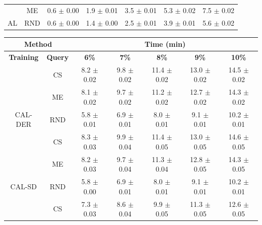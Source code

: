 \begin{table}[htbp]
\begin{tabular*}{\linewidth}{c|c|@{\extracolsep{\fill}}ccccc}
 & ME & 0.6 $\pm$ {\small 0.00} & 1.9 $\pm$ {\small 0.01} & 3.5 $\pm$ {\small 0.01} & 5.3 $\pm$ {\small 0.02} & 7.5 $\pm$ {\small 0.02}\\

\multirow{-3}{*}{\raggedright\arraybackslash AL} & RND & 0.6 $\pm$ {\small 0.00} & 1.4 $\pm$ {\small 0.00} & 2.5 $\pm$ {\small 0.01} & 3.9 $\pm$ {\small 0.01} & 5.6 $\pm$ {\small 0.02}\\
\bottomrule
\end{tabular*}
\vspace{0.5em}

\begin{tabular*}{\linewidth}{c|c|@{\extracolsep{\fill}}ccccc}
\toprule
\multicolumn{2}{c|}{\textbf{Method}} & \multicolumn{5}{c}{\textbf{Time (min)}} \\
\midrule
\textbf{Training} & \textbf{Query} & \textbf{6\%} & \textbf{7\%} & \textbf{8\%} & \textbf{9\%} & \textbf{10\%}\\
\midrule
 & CS & 8.2 $\pm$ {\small 0.02} & 9.8 $\pm$ {\small 0.02} & 11.4 $\pm$ {\small 0.02} & 13.0 $\pm$ {\small 0.02} & 14.5 $\pm$ {\small 0.02}\\

 & ME & 8.1 $\pm$ {\small 0.02} & 9.7 $\pm$ {\small 0.02} & 11.2 $\pm$ {\small 0.02} & 12.7 $\pm$ {\small 0.02} & 14.3 $\pm$ {\small 0.02}\\

\multirow{-3}{*}{\raggedright\arraybackslash CAL-DER} & RND & 5.8 $\pm$ {\small 0.01} & 6.9 $\pm$ {\small 0.01} & 8.0 $\pm$ {\small 0.01} & 9.1 $\pm$ {\small 0.01} & 10.2 $\pm$ {\small 0.01}\\
\midrule
 & CS & 8.3 $\pm$ {\small 0.03} & 9.9 $\pm$ {\small 0.04} & 11.4 $\pm$ {\small 0.05} & 13.0 $\pm$ {\small 0.05} & 14.6 $\pm$ {\small 0.05}\\

 & ME & 8.2 $\pm$ {\small 0.03} & 9.7 $\pm$ {\small 0.04} & 11.3 $\pm$ {\small 0.04} & 12.8 $\pm$ {\small 0.05} & 14.3 $\pm$ {\small 0.05}\\

\multirow{-3}{*}{\raggedright\arraybackslash CAL-SD} & RND & 5.8 $\pm$ {\small 0.00} & 6.9 $\pm$ {\small 0.01} & 8.0 $\pm$ {\small 0.01} & 9.1 $\pm$ {\small 0.01} & 10.2 $\pm$ {\small 0.01}\\
\midrule
 & CS & 7.3 $\pm$ {\small 0.03} & 8.6 $\pm$ {\small 0.04} & 9.9 $\pm$ {\small 0.05} & 11.3 $\pm$ {\small 0.05} & 12.6 $\pm$ {\small 0.05}\\


\end{tabular*}
\end{table}
